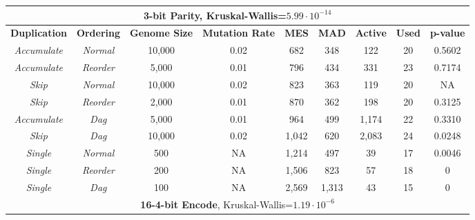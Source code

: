 \documentclass[journal]{IEEEtran}
\begin{document}
\begin{table}
	\centering
	\begin{tabular}{|c|c|c|c|c|c|c|c|c|}
	  \hline
	  \multicolumn{9}{|c|}{\textbf{3-bit Parity}, Kruskal-Wallis=$5.99\cdot 10^{-14}$} \\ \hline
\textbf{Duplication} & \textbf{Ordering} & \textbf{Genome Size} & \textbf{Mutation Rate} & \textbf{MES} & \textbf{MAD} & \textbf{Active} & \textbf{Used} & \textbf{p-value} \\ \hline
\emph{Accumulate} & \emph{Normal} & 10,000 & 0.02 & 682 & 348 & 122 & 20 & 0.5602 \\ \hline
\emph{Accumulate} & \emph{Reorder}&  5,000 & 0.01 & 796 & 434 & 331 & 23 & 0.7174 \\ \hline
\rowcolor{Gray}
\emph{Skip} & \emph{Normal}       & 10,000 & 0.02 & 823 & 363 & 119 & 20 & NA \\ \hline
\emph{Skip} & \emph{Reorder}      &  2,000 & 0.01 & 870 & 362 & 198 & 20 & 0.3125 \\ \hline
\emph{Accumulate} & \emph{Dag}    &  5,000 & 0.01 & 964 & 499 & 1,174 & 22 & 0.3310 \\ \hline
\emph{Skip} & \emph{Dag}          & 10,000 & 0.02 & 1,042 & 620 & 2,083 & 24 & 0.0248 \\ \hline
\emph{Single} & \emph{Normal}     & 500 & NA & 1,214 & 497 & 39 & 17 & 0.0046 \\ \hline
\emph{Single} & \emph{Reorder}    & 200 & NA & 1,506 & 823 & 57 & 18 & 0 \\ \hline
\emph{Single} & \emph{Dag}        & 100 & NA & 2,569 & 1,313 & 43 & 15 & 0 \\ \hline\hline

	  \multicolumn{9}{|c|}{\textbf{16-4-bit Encode}, Kruskal-Wallis=$1.19\cdot 10^{-6}$} \\ \hline


\end{tabular}
\end{table}
\end{document}

